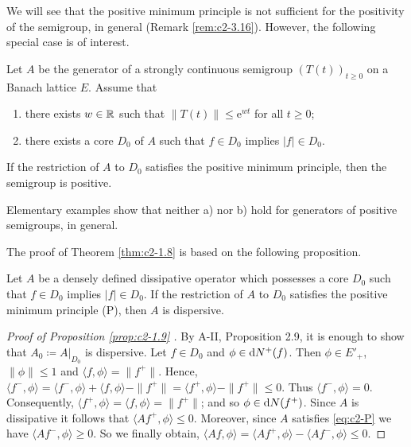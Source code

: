 We will see that the positive minimum principle is not sufficient for the positivity of the semigroup, in general (Remark \ref{rem:c2-3.16}).
However, the following special case is of interest.
\begin{theorem}\label{thm:c2-1.8}
Let $A$ be the generator of a strongly continuous semigroup $(T(t))_{t \geq 0}$ on a Banach lattice $E$.
Assume that
\begin{enumerate}[\upshape (i)]
\item \label{thm:c2-1.8-1}
there exists $w \in \mathbb{R}$ such that $\|T(t)\| \leq \mathrm{e}^{wt}$ for all $t \geq 0$;
\item \label{thm:c2-1.8-2}
there exists a core $D_{0}$ of $A$ such that $f \in D_{0}$ implies $|f| \in D_{0}$.
\end{enumerate}
If the restriction of $A$ to $D_{0}$ satisfies the positive minimum principle, then the semigroup is positive.
\end{theorem}
\begin{remark*}\label{rem:c2-1.8-Claude}
Elementary examples show that neither a) nor b) hold for generators of positive semigroups, in general.
\end{remark*}
The proof of Theorem \ref{thm:c2-1.8}   is based on the following proposition.
\begin{proposition}\label{prop:c2-1.9}
Let $A$ be a densely defined dissipative operator which possesses a core $D_{0}$ such that $f \in D_{0}$ implies $|f| \in D_{0}$.
If the restriction of $A$ to $D_{0}$ satisfies the positive minimum principle (P), then $A$ is dispersive.
\end{proposition}
\begin{proof}[Proof of Proposition \ref{prop:c2-1.9}  ]
By A-II, Proposition 2.9, it is enough to show that $A_{0} \coloneqq A|_{D_{0}}$ is dispersive.
Let $f \in D_{0}$ and $\phi \in \mathop{}\!\mathrm{d}{N^{+}}(f)$.
Then $\phi \in E'_{+}$, $\|\phi\| \leq 1$ and $\langle f,\phi \rangle = \|f^{+}\|$.
Hence, $\langle f^{-},\phi \rangle = \langle f^{-},\phi \rangle + \langle f,\phi \rangle - \|f^{+}\| = \langle f^{+},\phi \rangle - \|f^{+}\| \leq 0$.
Thus $\langle f^{-},\phi \rangle = 0$.
Consequently, $\langle f^{+},\phi \rangle = \langle f,\phi \rangle = \|f^{+}\|$; and so $\phi \in \mathop{}\!\mathrm{d}{N}(f^{+})$.
Since $A$ is dissipative it follows that $\langle Af^{+},\phi \rangle \leq 0$.
Moreover, since $A$ satisfies \eqref{eq:c2-P} we have $\langle Af^{-},\phi \rangle \geq 0$.
So we finally obtain, $\langle Af,\phi \rangle = \langle Af^{+},\phi \rangle - \langle Af^{-},\phi \rangle \leq 0$.
\end{proof}
